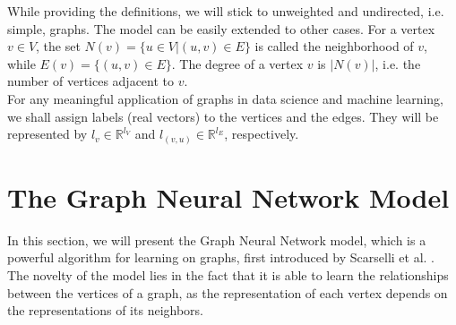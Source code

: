 \documentclass[12pt]{article}
\begin{document}
    While providing the definitions, we will stick to unweighted and undirected, i.e.
    simple,  graphs.  The model can be easily extended to other cases.
    For a vertex $v \in V$, the set $N(v) = \{u \in V | (u, v) \in E\}$ is called the
    neighborhood  of  $v$, while $E(v) = \{(u, v) \in E\}$. The  degree  of  a  vertex  $v$  is  $|N(v)|$,  i.e. the
    number  of  vertices  adjacent  to  $v$.
    \\

    For any meaningful application of graphs in data science and machine learning, we
    shall assign labels (real vectors) to the vertices and the edges. They will be represented by
    $l_v \in \mathbb{R}^{l_V}$ and $l_{(v, u)} \in \mathbb{R}^{l_E}$, respectively.

    

\section{The Graph Neural Network Model}
    \indent 
    In this section, we will present the Graph Neural Network model, which is a
    powerful algorithm for learning on graphs, first introduced by Scarselli et al.
    \cite{scarselli2009graph}. 
    \\
    \indent The novelty of the model lies in the fact that it is able to learn the relationships
    between the vertices of a graph, as the representation of each vertex depends on the
    representations of its neighbors.
\end{document}

